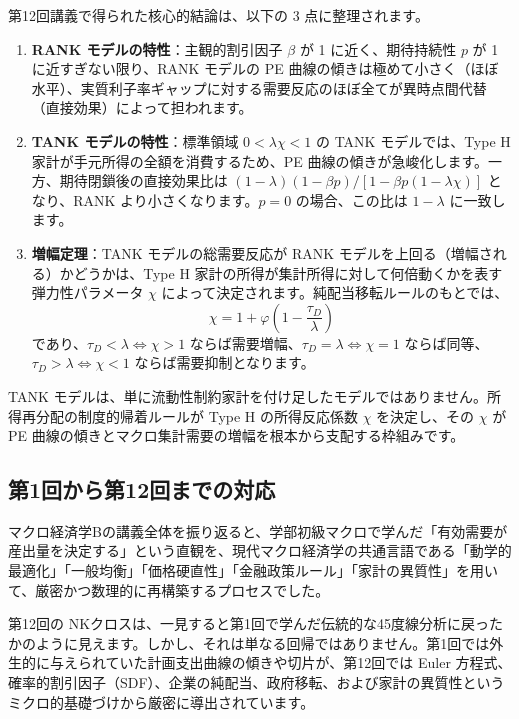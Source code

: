 \documentclass[
  japanese,
  lualatex,
  ja=standard,
  12pt,
  a4paper]{ltjsarticle}
\providecommand{\tightlist}{%
  \setlength{\itemsep}{0pt}\setlength{\parskip}{0pt}}
\begin{document}
第12回講義で得られた核心的結論は、以下の 3 点に整理されます。

\begin{enumerate}
\def\labelenumi{\arabic{enumi}.}
\tightlist
\item
  \textbf{RANK モデルの特性}：主観的割引因子 \(\beta\) が 1
  に近く、期待持続性 \(p\) が 1 に近すぎない限り、RANK モデルの PE
  曲線の傾きは極めて小さく（ほぼ水平）、実質利子率ギャップに対する需要反応のほぼ全てが異時点間代替（直接効果）によって担われます。
\item
  \textbf{TANK モデルの特性}：標準領域 \(0<\lambda\chi<1\) の TANK
  モデルでは、Type H 家計が手元所得の全額を消費するため、PE
  曲線の傾きが急峻化します。一方、期待閉鎖後の直接効果比は
  \((1-\lambda)(1-\beta p)/[1-\beta p(1-\lambda\chi)]\) となり、RANK
  より小さくなります。\(p=0\) の場合、この比は \(1-\lambda\)
  に一致します。
\item
  \textbf{増幅定理}：TANK モデルの総需要反応が RANK
  モデルを上回る（増幅される）かどうかは、Type H
  家計の所得が集計所得に対して何倍動くかを表す弾力性パラメータ \(\chi\)
  によって決定されます。純配当移転ルールのもとでは、 \[
  \chi = 1 + \varphi\left( 1 - \frac{\tau_D}{\lambda} \right)
  \] であり、\(\tau_D < \lambda \iff \chi > 1\)
  ならば需要増幅、\(\tau_D = \lambda \iff \chi = 1\)
  ならば同等、\(\tau_D > \lambda \iff \chi < 1\)
  ならば需要抑制となります。
\end{enumerate}

TANK
モデルは、単に流動性制約家計を付け足したモデルではありません。所得再分配の制度的帰着ルールが
Type H の所得反応係数 \(\chi\) を決定し、その \(\chi\) が PE
曲線の傾きとマクロ集計需要の増幅を根本から支配する枠組みです。

\subsection{第1回から第12回までの対応}\label{ux7b2c1ux56deux304bux3089ux7b2c12ux56deux307eux3067ux306eux5bfeux5fdc}

マクロ経済学Bの講義全体を振り返ると、学部初級マクロで学んだ「有効需要が産出量を決定する」という直観を、現代マクロ経済学の共通言語である「動学的最適化」「一般均衡」「価格硬直性」「金融政策ルール」「家計の異質性」を用いて、厳密かつ数理的に再構築するプロセスでした。

第12回の
NKクロスは、一見すると第1回で学んだ伝統的な45度線分析に戻ったかのように見えます。しかし、それは単なる回帰ではありません。第1回では外生的に与えられていた計画支出曲線の傾きや切片が、第12回では
Euler
方程式、確率的割引因子（SDF）、企業の純配当、政府移転、および家計の異質性というミクロ的基礎づけから厳密に導出されています。
\end{document}
